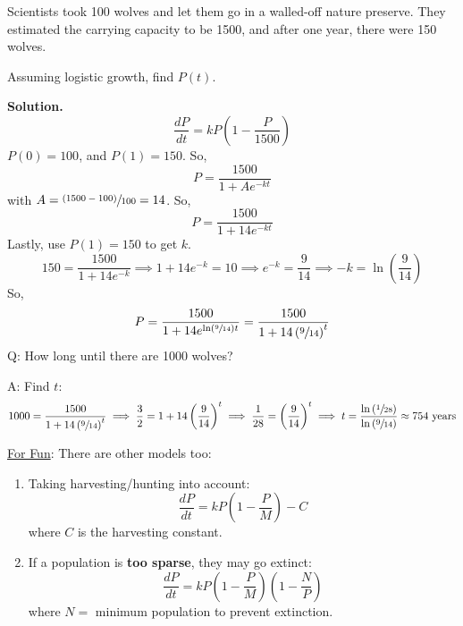\begin{Example}{}{}
    Scientists took 100 wolves and let them go in a walled-off nature preserve. They
    estimated the carrying capacity to be 1500, and after one year, there were 150 wolves.

    Assuming logistic growth, find $ P(t) $.

    \textbf{Solution.}
    \[ \frac{dP}{dt}=kP\left(1-\frac{P}{1500}\right)  \]
    $ P(0)=100 $, and $ P(1)=150 $. So,
    \[ P=\frac{1500}{1+Ae^{-kt}}  \]
    with $ A=\sfrac{(1500-100)}{100}=14  $. So,
    \[ P=\frac{1500}{1+14e^{-kt}}  \]
    Lastly, use $ P(1)=150 $ to get $ k $.
    \[ 150=\frac{1500}{1+14e^{-k}}\implies 1+14e^{-k}=10\implies e^{-k}=\frac{9}{14} \implies
        -k=\ln\left( \frac{9}{14} \right) \]
    So,
    \[ P=\frac{1500}{1+14e^{\ln\left( \sfrac{9}{14}  \right)t}} =\frac{1500}{1+14\left( \sfrac{9}{14}  \right)^t} \]
    Q\@: How long until there are 1000 wolves?

    A\@: Find $ t $:
    \[ 1000=\frac{1500}{1+14\left( \sfrac{9}{14}  \right)^t}
        \implies \frac{3}{2} =1+14\left( \frac{9}{14}  \right)^t
        \implies \frac{1}{28} =\left( \frac{9}{14} \right)^t
        \implies t=\frac{\ln\left( \sfrac{1}{28}  \right)}{\ln\left( \sfrac{9}{14}\right)}
        \approx 754\text{ years}\]
\end{Example}

\underline{For Fun}: There are other models too:
\begin{enumerate}
    \item Taking harvesting/hunting into account:
          \[ \frac{dP}{dt}=kP\left( 1-\frac{P}{M} \right)-C \]
          where $ C $ is the harvesting constant.
    \item If a population is \textbf{too sparse}, they may go extinct:
          \[ \frac{dP}{dt}=kP\left( 1-\frac{P}{M} \right)\left( 1-\frac{N}{P}  \right)  \]
          where $ N= $ minimum population to prevent extinction.
\end{enumerate}
